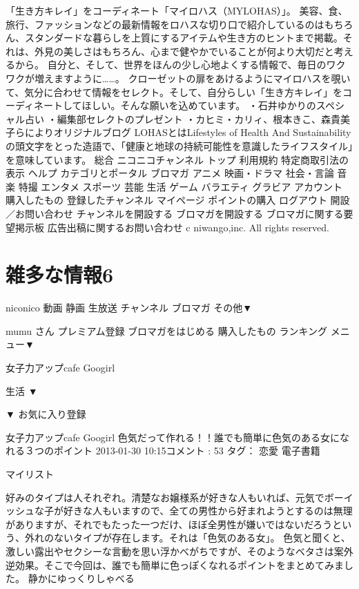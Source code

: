 「生き方キレイ」をコーディネート「マイロハス（MYLOHAS）」。 美容、食、旅行、ファッションなどの最新情報をロハスな切り口で紹介しているのはもちろん、スタンダードな暮らしを上質にするアイテムや生き方のヒントまで掲載。それは、外見の美しさはもちろん、心まで健やかでいることが何より大切だと考えるから。 自分と、そして、世界をほんの少し心地よくする情報で、毎日のワクワクが増えますように……。 クローゼットの扉をあけるようにマイロハスを覗いて、気分に合わせて情報をセレクト。そして、自分らしい「生き方キレイ」をコーディネートしてほしい。そんな願いを込めています。 ・石井ゆかりのスペシャル占い ・編集部セレクトのプレゼント ・カヒミ・カリィ、根本きこ、森貴美子らによりオリジナルブログ LOHASとはLifestyles of Health And Sustainabilityの頭文字をとった造語で、「健康と地球の持続可能性を意識したライフスタイル」を意味しています。
総合
ニコニコチャンネル トップ 
利用規約 
特定商取引法の表示 
ヘルプ 
カテゴリとポータル
ブロマガ 
アニメ 
映画・ドラマ 
社会・言論 
音楽 
特撮 
エンタメ 
スポーツ 
芸能 
生活 
ゲーム 
バラエティ 
グラビア 
アカウント
購入したもの 
登録したチャンネル 
マイページ 
ポイントの購入 
ログアウト 
開設／お問い合わせ
チャンネルを開設する 
ブロマガを開設する 
ブロマガに関する要望掲示板 
広告出稿に関するお問い合わせ 
c niwango,inc. All rights reserved.

\section{雑多な情報6}
niconico
動画
静画
生放送
チャンネル
ブロマガ
その他▼ 

mumu さん
プレミアム登録 
ブロマガをはじめる  
購入したもの  
ランキング  
メニュー▼ 


女子力アップcafe Googirl

生活  
▼  
  
  
▼ 
お気に入り登録

女子力アップcafe Googirl
色気だって作れる！！誰でも簡単に色気のある女になれる３つのポイント
2013-01-30 10:15コメント : 53 
タグ： 恋愛    
電子書籍
    
マイリスト  



好みのタイプは人それぞれ。清楚なお嬢様系が好きな人もいれば、元気でボーイッシュな子が好きな人もいますので、全ての男性から好まれようとするのは無理がありますが、それでもたった一つだけ、ほぼ全男性が嫌いではないだろうという、外れのないタイプが存在します。それは「色気のある女」。
色気と聞くと、激しい露出やセクシーな言動を思い浮かべがちですが、そのようなベタさは案外逆効果。そこで今回は、誰でも簡単に色っぽくなれるポイントをまとめてみました。
静かにゆっくりしゃべる

